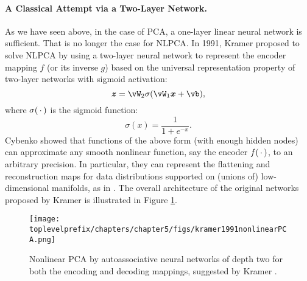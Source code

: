 \documentclass[\toplevelprefix/book-main.tex]{subfiles}
\begin{document}
\paragraph{A Classical Attempt via a Two-Layer Network.} As we have
seen above, in the case of PCA, a one-layer linear neural
network is sufficient. That is no longer the case for NLPCA. In 1991, Kramer
\cite{Kramer1991NonlinearPC}  proposed to solve NLPCA by using a two-layer
neural network to represent the encoder mapping $f$ (or its inverse $g$) based
on the universal representation property of two-layer networks with sigmoid
activation:
\begin{equation}
  \z = \vW_2 \sigma(\vW_1\x +\vb),
\end{equation}
where $\sigma(\,\cdot\,)$ is the sigmoid function:
\begin{equation}
  \sigma(x) = \frac{1}{1+ e^{-x}}.
\end{equation}
Cybenko \cite{Cybenko1989ApproximationBS} showed that functions of
the above form (with enough hidden nodes) can approximate any smooth
nonlinear function, say the encoder $f(\,\cdot\,)$, to an arbitrary
precision. In particular, they can represent the flattening and reconstruction
maps for data distributions supported on (unions of) low-dimensional manifolds,
as in . The overall architecture of the
original networks proposed by Kramer is illustrated in Figure \ref{fig:NLPCA}.
\begin{figure}[tb]
  \centering
  \texttt{[image: \\toplevelprefix/chapters/chapter5/figs/kramer1991nonlinearPCA.png]}
  \caption{Nonlinear PCA by  autoassociative neural networks of depth
    two for both the encoding and decoding mappings, suggested by
  Kramer \cite{Kramer1991NonlinearPC}.}
  \label{fig:NLPCA}
\end{figure}
\end{document}
